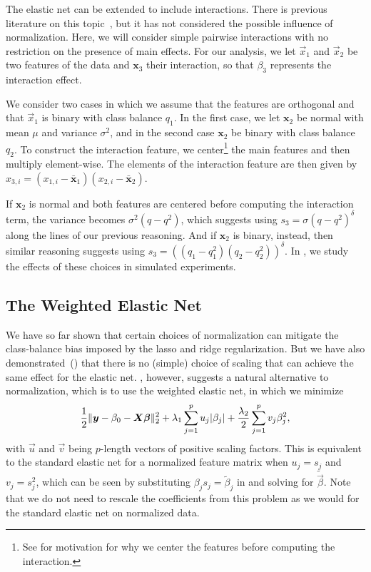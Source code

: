 The elastic net can be extended to include interactions. There is previous literature on
this topic~\citep{bien2013,zemlianskaia2022,lim2015}, but it has not considered the
possible influence of normalization. Here, we will consider simple pairwise interactions
with no restriction on the presence of main effects. For our analysis, we let \(\vec{x}_1\)
and \(\vec{x}_2\) be two features of the data and \(\bm{x}_3\) their interaction, so that
\(\beta_3\) represents the interaction effect.

We consider two cases in which we assume that the features are orthogonal and that
\(\vec{x}_1\) is binary with class balance \(q_1\). In the first case, we let \(\bm{x}_2\)
be normal with mean \(\mu\) and variance \(\sigma^2\), and in the second case \(\bm{x}_2\)
be binary with class balance \(q_2\). To construct the interaction feature, we
center\footnote{See  for motivation for why we center the
  features before computing the interaction.} the main features and then multiply
element-wise. The elements of the interaction feature are then given by \(x_{3,i} =
(x_{1,i} - \bar{\bm{x}}_1)(x_{2,i} - \bar{\bm{x}}_2)\).

If \(\bm{x}_2\) is normal and both features are centered before computing the interaction
term, the variance becomes \(\sigma^2 (q-q^2)\), which suggests using \(s_3 = \sigma (q -
q^2)^\delta\) along the lines of our previous reasoning. And if \(\bm{x}_2\) is binary,
instead, then similar reasoning suggests using \(s_3 = ((q_1-q_1^2)(q_2-q_2^2))^\delta\).
In , we study the effects of these choices in simulated
experiments.

\subsection{The Weighted Elastic Net}\label{sec:binary-weighting}

We have so far shown that certain choices of normalization can mitigate the class-balance
bias imposed by the lasso and ridge regularization. But we have also
demonstrated~() that there is no (simple) choice of
scaling that can achieve the same effect for the elastic net.
, however, suggests a natural alternative to normalization,
which is to use the weighted elastic net, in which we minimize
\[
  \frac{1}{2} \lVert \boldsymbol{y} - \beta_0 - \boldsymbol{X}\boldsymbol{\beta}\rVert_2^2 + \lambda_1 \sum_{j=1}^p u_j |\beta_j| + \frac{\lambda_2}{2} \sum_{j=1}^p v_j \beta_j^2,
\]
with \(\vec{u}\) and \(\vec{v}\) being \(p\)-length vectors of positive scaling factors.
This is equivalent to the standard elastic net for a normalized feature matrix when \(u_j =
s_j\) and \(v_j = s_j^2\), which can be seen by substituting \(\beta_js_j =
\tilde{\beta}_j\) in  and solving for \(\tilde{\vec{\beta}}\). Note
that we do not need to rescale the coefficients from this problem as we would for the
standard elastic net on normalized data.

